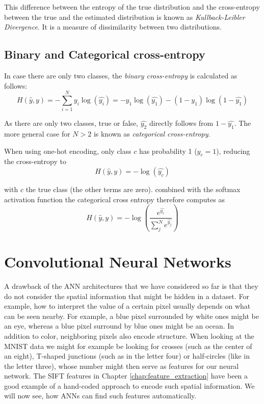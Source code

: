 This difference between the entropy of the true distribution and the cross-entropy between the true and the estimated distribution is known as \emph{Kullback-Leibler Divergence}. It is a measure of dissimilarity between two distributions. 

\subsection{Binary and Categorical cross-entropy}
In case there are only two classes, the \emph{binary cross-entropy} is calculated as follows:
\begin{equation}
H(\hat{y},y)=-\sum_{i=1}^Ny_i\log(\hat{y_i})=-y_1\log(\hat{y_1})-(1-y_1)\log(1-\hat{y_1})
\end{equation}

As there are only two classes, true or false, $\hat{y_2}$ directly follows from $1-\hat{y_1}$. 
The more general case for $N>2$ is known as \emph{categorical cross-entropy}. 

When using one-hot encoding, only class $c$ has probability 1 ($y_c=1$), reducing the cross-entropy to 
\begin{equation}
H(\hat{y},y)=-\log(\hat{y_c})
\end{equation}

with $c$ the true class (the other terms are zero). 
combined with the softmax activation function the categorical cross entropy therefore computes as
\begin{equation}
H(\hat{y},y) = -\log\left(\frac{e^{\hat{y_c}}}{\sum_{j}^N e^{\hat{y_j}}}\right)
\end{equation}


\section{Convolutional Neural Networks}
A drawback of the ANN architectures that we have considered so far is that they do not consider the spatial information that might be hidden in a dataset. 
For example, how to interpret the value of a certain pixel usually depends on what can be seen nearby. For example, a blue pixel surrounded by white ones might be an eye, whereas a blue pixel surround by blue ones might be an ocean. In addition to color, neighboring pixels also encode structure. When looking at the MNIST data we might for example be looking for crosses (such as the center of an eight), T-shaped junctions (such as in the letter four) or half-circles (like in the letter three), whose number might then serve as features for our neural network. The SIFT features in Chapter \ref{chap:feature_extraction} have been a good example of a hand-coded approach to encode such spatial information. We will now see, how ANNs can find such features automatically. 

